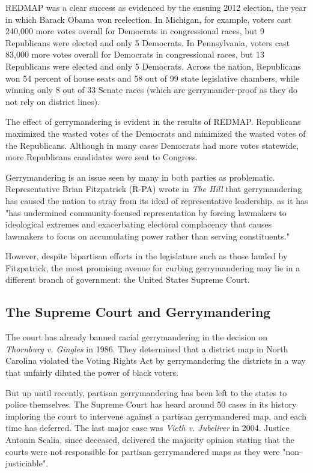 \documentclass[sigconf]{acmart}
\begin{document}
REDMAP was a clear success as evidenced by the ensuing 2012 election, the year in which Barack Obama won reelection. In Michigan, for example, voters cast 240,000 more votes overall for Democrats in congressional races, but 9 Republicans were elected and only 5 Democrats. In Pennsylvania, voters cast 83,000 more votes overall for Democrats in congressional races, but 13 Republicans were elected and only 5 Democrats. Across the nation, Republicans won 54 percent of house seats and 58 out of 99 state legislative chambers, while winning only 8 out of 33 Senate races (which are gerrymander-proof as they do not rely on district lines).\cite{redmap}

The effect of gerrymandering is evident in the results of REDMAP. Republicans maximized the wasted votes of the Democrats and minimized the wasted votes of the Republicans. Although in many cases Democrats had more votes statewide, more Republicans candidates were sent to Congress. 

Gerrymandering is an issue seen by many in both parties as problematic. Representative Brian Fitzpatrick (R-PA) wrote in \textit{The Hill} that gerrymandering has caused the nation to stray from its ideal of representative leadership, as it has "has undermined community-focused representation by forcing lawmakers to ideological extremes and exacerbating electoral complacency that causes lawmakers to focus on accumulating power rather than serving constituents."\cite{bipartisan}

However, despite bipartisan efforts in the legislature such as those lauded by Fitzpatrick, the most promising avenue for curbing gerrymandering may lie in a different branch of government: the United States Supreme Court. 

\subsection{The Supreme Court and Gerrymandering}
The court has already banned racial gerrymandering in the decision on \textit{Thornburg v. Gingles} in 1986. They determined that a district map in North Carolina violated the Voting Rights Act by gerrymandering the districts in a way that unfairly diluted the power of black voters.\cite{thornburg}

But up until recently, partisan gerrymandering has been left to the states to police themselves. The Supreme Court has heard around 50 cases in its history imploring the court to intervene against a partisan gerrymandered map, and each time has deferred.\cite{chicago} The last major case was \textit{Vieth v. Jubelirer} in 2004. Justice Antonin Scalia, since deceased, delivered the majority opinion stating that the courts were not responsible for partisan gerrymandered maps as they were "non-justiciable".\cite{wapo}
\end{document}
